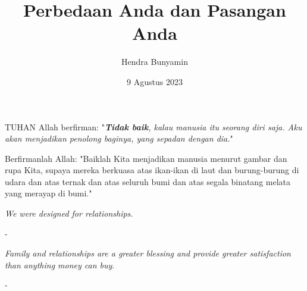 \documentclass{beamer}
\title[Perbedaan]{%
    Perbedaan Anda dan Pasangan Anda
}
\author{Hendra Bunyamin}
\institute{
        \textit{ }\\
		\textit{ }
        \vspace{0.5cm}
}
\date[Venue and Date]{%
    9 Agustus 2023
}
\begin{document}

{
    \maketitle
}


\begin{frame}{}
	\Large
	\begin{tcolorbox}[colback=green!5,colframe=green!40!black,title=Kejadian 2:18 (TB)]
		TUHAN Allah berfirman: "\textit{\textbf{Tidak baik}, kalau manusia itu seorang diri saja. Aku akan menjadikan penolong baginya, yang sepadan dengan dia.}"
	\end{tcolorbox}
\end{frame}

\begin{frame}{}
	\Large
\begin{tcolorbox}[colback=green!5,colframe=green!40!black,title=Kejadian 1:26 (TB)]
Berfirmanlah Allah: "Baiklah Kita menjadikan manusia menurut gambar dan rupa Kita, supaya mereka berkuasa atas ikan-ikan di laut dan burung-burung di udara dan atas ternak dan atas seluruh bumi dan atas segala binatang melata yang merayap di bumi."
\end{tcolorbox}
\end{frame}

\begin{frame}{}
	\LARGE
	\centering
	\textit{We were designed for relationships}.
	
	\bigskip
	\normalsize
	- \citet{keller2013themeaning}
\end{frame}

\begin{frame}{}
	\LARGE
	\centering
	\textit{Family and relationships are a greater blessing and provide greater satisfaction than anything money can buy}.
	
	\bigskip
	\normalsize
	- \citet{keller2013themeaning}	
\end{frame}
\end{document}
